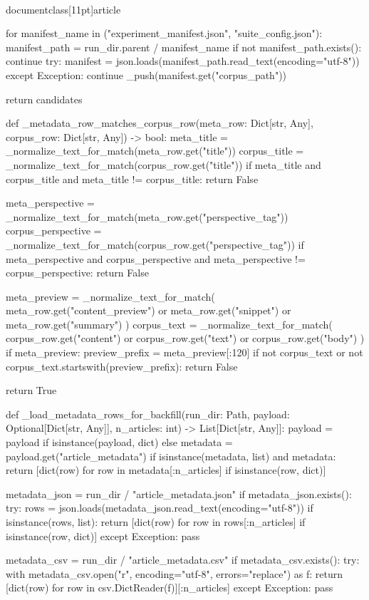 \\documentclass[11pt]{article}
\begin{document}
\begin{CodeBlock}
    for manifest_name in ("experiment_manifest.json", "suite_config.json"):
        manifest_path = run_dir.parent / manifest_name
        if not manifest_path.exists():
            continue
        try:
            manifest = json.loads(manifest_path.read_text(encoding="utf-8"))
        except Exception:
            continue
        _push(manifest.get("corpus_path"))

    return candidates


def _metadata_row_matches_corpus_row(meta_row: Dict[str, Any], corpus_row: Dict[str, Any]) -> bool:
    meta_title = _normalize_text_for_match(meta_row.get("title"))
    corpus_title = _normalize_text_for_match(corpus_row.get("title"))
    if meta_title and corpus_title and meta_title != corpus_title:
        return False

    meta_perspective = _normalize_text_for_match(meta_row.get("perspective_tag"))
    corpus_perspective = _normalize_text_for_match(corpus_row.get("perspective_tag"))
    if meta_perspective and corpus_perspective and meta_perspective != corpus_perspective:
        return False

    meta_preview = _normalize_text_for_match(
        meta_row.get("content_preview") or meta_row.get("snippet") or meta_row.get("summary")
    )
    corpus_text = _normalize_text_for_match(
        corpus_row.get("content") or corpus_row.get("text") or corpus_row.get("body")
    )
    if meta_preview:
        preview_prefix = meta_preview[:120]
        if not corpus_text or not corpus_text.startswith(preview_prefix):
            return False

    return True


def _load_metadata_rows_for_backfill(run_dir: Path, payload: Optional[Dict[str, Any]], n_articles: int) -> List[Dict[str, Any]]:
    payload = payload if isinstance(payload, dict) else {}
    metadata = payload.get("article_metadata")
    if isinstance(metadata, list) and metadata:
        return [dict(row) for row in metadata[:n_articles] if isinstance(row, dict)]

    metadata_json = run_dir / "article_metadata.json"
    if metadata_json.exists():
        try:
            rows = json.loads(metadata_json.read_text(encoding="utf-8"))
            if isinstance(rows, list):
                return [dict(row) for row in rows[:n_articles] if isinstance(row, dict)]
        except Exception:
            pass

    metadata_csv = run_dir / "article_metadata.csv"
    if metadata_csv.exists():
        try:
            with metadata_csv.open("r", encoding="utf-8", errors="replace") as f:
                return [dict(row) for row in csv.DictReader(f)][:n_articles]
        except Exception:
            pass


\end{CodeBlock}
\end{document}
